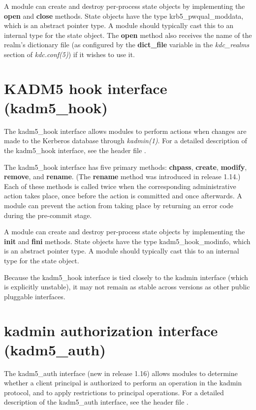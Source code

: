 \documentclass[letterpaper,10pt,english]{sphinxmanual}
\begin{document}
A module can create and destroy per-process state objects by
implementing the \textbf{open} and \textbf{close} methods.  State objects have
the type krb5\_pwqual\_moddata, which is an abstract pointer type.  A
module should typically cast this to an internal type for the state
object.  The \textbf{open} method also receives the name of the realm's
dictionary file (as configured by the \textbf{dict\_file} variable in the
\emph{kdc\_realms} section of \emph{kdc.conf(5)}) if it wishes to use
it.


\section{KADM5 hook interface (kadm5\_hook)}
\label{plugindev/kadm5_hook:kadm5-hook-interface-kadm5-hook}\label{plugindev/kadm5_hook::doc}\label{plugindev/kadm5_hook:kadm5-hook-plugin}
The kadm5\_hook interface allows modules to perform actions when
changes are made to the Kerberos database through \emph{kadmin(1)}.
For a detailed description of the kadm5\_hook interface, see the header
file .

The kadm5\_hook interface has five primary methods: \textbf{chpass},
\textbf{create}, \textbf{modify}, \textbf{remove}, and \textbf{rename}.  (The \textbf{rename}
method was introduced in release 1.14.)  Each of these methods is
called twice when the corresponding administrative action takes place,
once before the action is committed and once afterwards.  A module can
prevent the action from taking place by returning an error code during
the pre-commit stage.

A module can create and destroy per-process state objects by
implementing the \textbf{init} and \textbf{fini} methods.  State objects have
the type kadm5\_hook\_modinfo, which is an abstract pointer type.  A
module should typically cast this to an internal type for the state
object.

Because the kadm5\_hook interface is tied closely to the kadmin
interface (which is explicitly unstable), it may not remain as stable
across versions as other public pluggable interfaces.


\section{kadmin authorization interface (kadm5\_auth)}
\label{plugindev/kadm5_auth:kadm5-auth-plugin}\label{plugindev/kadm5_auth:kadmin-authorization-interface-kadm5-auth}\label{plugindev/kadm5_auth::doc}
The kadm5\_auth interface (new in release 1.16) allows modules to
determine whether a client principal is authorized to perform an
operation in the kadmin protocol, and to apply restrictions to
principal operations.  For a detailed description of the kadm5\_auth
interface, see the header file .
\end{document}
